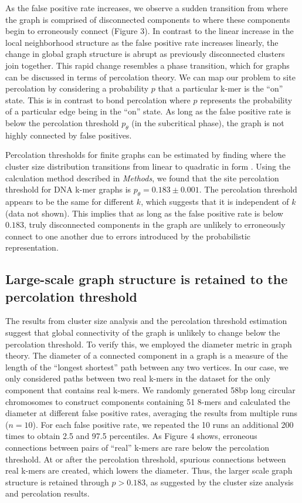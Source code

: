 \documentclass[12pt]{article} \usepackage{simplemargins}
\begin{document}
As the false positive rate increases, we observe a sudden
transition from where the graph is comprised of disconnected 
components to where these components begin to erroneously connect (Figure 3). 
In contrast to the linear increase in the local neighborhood structure
as the false positive rate increases linearly, 
the change in global graph structure is abrupt as previously disconnected 
clusters join together.  
This rapid change resembles a phase transition, which for graphs
can be 
discussed in terms of percolation theory. We can map 
our problem to site percolation by considering a probability $p$ that a 
particular k-mer is the ``on'' state. This is in contrast to bond percolation where 
$p$ represents the probability of a particular edge being in the ``on'' state. As
long as the false positive rate is below the percolation threshold $p_\theta$ (in
the subcritical phase), the graph is not highly connected by false positives.


Percolation thresholds for finite graphs can be estimated by
finding where the cluster size distribution transitions from linear to
quadratic in form \cite{stauffer1979scaling}.  Using the calculation method described
in \emph{Methods}, we found that the site percolation threshold for
DNA k-mer graphs is $p_\theta = 0.183 \pm 0.001$.  The percolation
threshold appears to be the same for different $k$, which suggests
that it is independent of $k$ (data not shown). This implies that as long as
the false positive rate is below $0.183$, truly disconnected components in the
graph are unlikely to erroneously connect to one another due to errors
introduced by the probabilistic representation.

\subsection{Large-scale graph structure is retained to the percolation threshold}
The results from cluster size analysis and the percolation threshold 
estimation suggest that 
global connectivity of the graph is unlikely 
to change below the percolation threshold. To verify this, we employed 
the diameter metric in graph theory.  
The diameter of a connected component in a graph is a measure of 
the length of the ``longest shortest'' 
path between any two vertices\cite{bondy2008graph}.
In our case, we only considered paths between two real k-mers
in the dataset for the only component that contains real k-mers. 
We randomly generated 58bp long circular
chromosomes to construct components containing 51 8-mers and 
calculated the diameter at different false positive rates, averaging
the results from multiple runs ($n=10$). For each false positive rate, we 
repeated the 10 runs an additional 200 times to obtain 2.5 and 97.5 
percentiles.
As Figure 4 shows, 
erroneous connections between pairs of ``real'' k-mers are rare
below the 
percolation threshold. At or after the percolation threshold, spurious connections 
between real k-mers are created, which lowers the diameter. 
Thus, the larger scale graph structure is retained through $p > 0.183$, as suggested by the cluster size analysis and percolation results.
\end{document}
